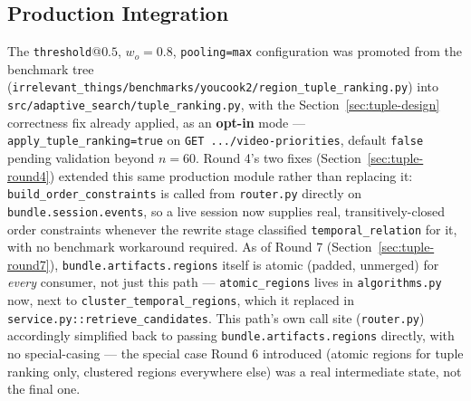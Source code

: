 \documentclass[11pt]{article}
\newcommand{\code}[1]{\texttt{\small #1}}
\newcommand{\file}[1]{\texttt{\footnotesize #1}}
\begin{document}
\subsection{Production Integration}
\label{sec:tuple-integration}
The \code{threshold}@$0.5$, $w_o{=}0.8$, \code{pooling=max} configuration
was promoted from the benchmark tree
(\file{irrelevant\_things/benchmarks/youcook2/region\_tuple\_ranking.py}) into
\file{src/adaptive\_search/tuple\_ranking.py}, with the Section~\ref{sec:tuple-design}
correctness fix already applied, as an \textbf{opt-in} mode ---
\code{apply\_tuple\_ranking=true} on \code{GET .../video-priorities}, default
\code{false} pending validation beyond $n=60$. Round 4's two fixes
(Section~\ref{sec:tuple-round4}) extended this same production module rather
than replacing it: \code{build\_order\_constraints} is called from
\code{router.py} directly on \code{bundle.session.events}, so a live session
now supplies real, transitively-closed order constraints whenever the
rewrite stage classified \code{temporal\_relation} for it, with no benchmark
workaround required. As of Round 7 (Section~\ref{sec:tuple-round7}),
\code{bundle.artifacts.regions} itself is atomic (padded, unmerged) for
\emph{every} consumer, not just this path --- \code{atomic\_regions} lives in
\file{algorithms.py} now, next to \code{cluster\_temporal\_regions}, which it
replaced in \code{service.py::retrieve\_candidates}. This path's own call
site (\code{router.py}) accordingly simplified back to passing
\code{bundle.artifacts.regions} directly, with no special-casing --- the
special case Round 6 introduced (atomic regions for tuple ranking only,
clustered regions everywhere else) was a real intermediate state, not the
final one.
\end{document}
